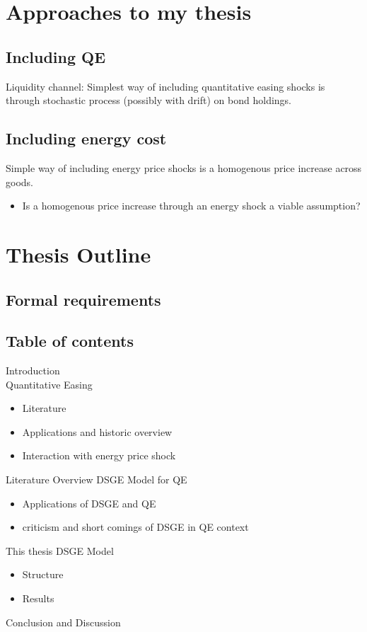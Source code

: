 \documentclass[11pt,a4paper,english]{article} %
\begin{document}
	\section{Approaches to my thesis}
	
	\subsection{Including QE}
	Liquidity channel: Simplest way of including quantitative easing shocks is through stochastic process (possibly with drift) on bond holdings.
	
	\subsection{Including energy cost}
	Simple way of including energy price shocks is a homogenous price increase across goods. 
	\begin{itemize}
		\item Is a homogenous price increase through an energy shock a viable assumption?
	\end{itemize}

	\section{Thesis Outline}
	\subsection{Formal requirements}
	
	\subsection{Table of contents}
	Introduction\\
	Quantitative Easing
	\begin{itemize}
		\item Literature
		\item Applications and historic overview
		\item Interaction with energy price shock
	\end{itemize}
	Literature Overview DSGE Model for QE
	\begin{itemize}
		\item Applications of DSGE and QE
		\item criticism and short comings of DSGE in QE context
	\end{itemize}
	This thesis DSGE Model
	\begin{itemize}
		\item Structure
		\item Results
	\end{itemize}
	Conclusion and Discussion
	
\end{document}
